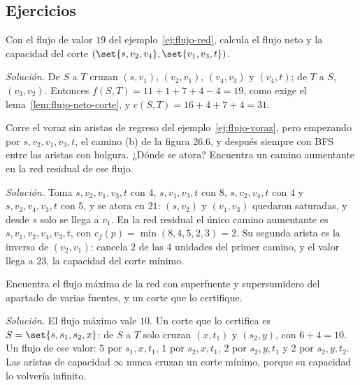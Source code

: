 \documentclass[11pt,letterpaper]{article}
\begin{document}

\subsection*{Ejercicios}

\begin{ejercicio}
  Con el flujo de valor $19$ del ejemplo~\ref{ej:flujo-red}, calcula
  el flujo neto y la capacidad del corte
  $(\set{s, v_2, v_4}, \set{v_1, v_3, t})$.

  \textit{Solución.} De $S$ a $T$ cruzan $(s, v_1)$, $(v_2, v_1)$,
  $(v_4, v_3)$ y $(v_4, t)$; de $T$ a $S$, $(v_3, v_2)$. Entonces
  $f(S, T) = 11 + 1 + 7 + 4 - 4 = 19$, como exige el
  lema~\ref{lem:flujo-neto-corte}, y
  $c(S, T) = 16 + 4 + 7 + 4 = 31$.
\end{ejercicio}

\begin{ejercicio}
  Corre el voraz sin aristas de regreso del
  ejemplo~\ref{ej:flujo-voraz}, pero empezando por
  $s, v_2, v_1, v_3, t$, el camino (b) de la figura 26.6, y después
  siempre con BFS entre las aristas con holgura. ¿Dónde se atora?
  Encuentra un camino aumentante en la red residual de ese flujo.

  \textit{Solución.} Toma $s, v_2, v_1, v_3, t$ con $4$,
  $s, v_1, v_3, t$ con $8$, $s, v_2, v_4, t$ con $4$ y
  $s, v_2, v_4, v_3, t$ con $5$, y se atora en $21$: $(s, v_2)$ y
  $(v_1, v_3)$ quedaron saturadas, y desde $s$ solo se llega a $v_1$.
  En la red residual el único camino aumentante es
  $s, v_1, v_2, v_4, v_3, t$, con
  $c_f(p) = \min(8, 4, 5, 2, 3) = 2$. Su segunda arista es la inversa
  de $(v_2, v_1)$: cancela $2$ de las $4$ unidades del primer camino,
  y el valor llega a $23$, la capacidad del corte mínimo.
\end{ejercicio}

\begin{ejercicio}
  Encuentra el flujo máximo de la red con superfuente y supersumidero
  del apartado de varias fuentes, y un corte que lo certifique.

  \textit{Solución.} El flujo máximo vale $10$. Un corte que lo
  certifica es $S = \set{s, s_1, s_2, x}$: de $S$ a $T$ solo cruzan
  $(x, t_1)$ y $(s_2, y)$, con $6 + 4 = 10$. Un flujo de ese valor:
  $5$ por $s_1, x, t_1$, $1$ por $s_2, x, t_1$, $2$ por $s_2, y, t_1$
  y $2$ por $s_2, y, t_2$. Las aristas de capacidad $\infty$ nunca
  cruzan un corte mínimo, porque su capacidad lo volvería infinito.
\end{ejercicio}
\end{document}
